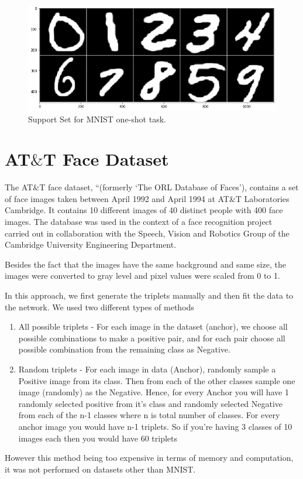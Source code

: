 \documentclass[aps,prb,twocolumn,superscriptaddress,floatfix,longbibliography, nofootinbib]{revtex4-2}
\newif\ifptitle
\newif\ifpnumber
\newcounter{para}
\newcommand\ptitle[1]{\par\refstepcounter{para}
{\ifpnumber{\noindent\textcolor{lightgray}{\textbf{\thepara}}\indent}\fi}
{\ifptitle{\textbf{[{#1}]}}\fi}}
\begin{document}
\begin{figure}[h]
    \includegraphics[clip=true,width=\columnwidth]{support.png}
    \caption{Support Set for MNIST one-shot task.} 
     \label{fig:support}
\end{figure}


\section{\label{sec:ATT}AT$\&$T Face Dataset}
\ptitle{Dataset Information}
The AT$\&$T face dataset, “(formerly ‘The ORL Database of Faces’), contains a set of face images taken between April 1992 and April 1994 at AT&T Laboratories Cambridge. It contains 10 different images of 40 distinct people with 400 face images. The database was used in the context of a face recognition project carried out in collaboration with the Speech, Vision and Robotics Group of the Cambridge University Engineering Department.

Besides the fact that the images have the same background and same size, the images were converted to gray level and pixel values were scaled from 0 to 1.

\ptitle{Offline Triplet Mining}
In this approach, we first generate the triplets manually and then fit the data to the network. We used two different types of methods
\begin{raggedright}
\begin{enumerate}
    \item All possible triplets - For each image in the dataset (anchor), we choose all possible combinations to make a positive pair, and for each pair choose all possible combination from the remaining class as Negative.
    \item Random triplets - For each image in data (Anchor), randomly sample a Positive image from its class.  Then from each of the other classes sample one image (randomly) as the Negative. Hence, for every Anchor you will have 1 randomly selected positive from it's class and randomly selected Negative from each of the n-1 classes where n is total number of classes.  For every anchor image you would have n-1 triplets. So if you're having 3 classes of 10 images each then you would have 60 triplets
\end{enumerate}
\end{raggedright}
 However this method being too expensive in terms of memory and computation, it was not performed on datasets other than MNIST.
\end{document}
